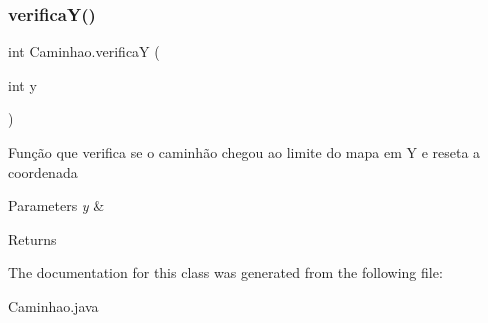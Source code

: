 \subsubsection{\texorpdfstring{verifica\+Y()}{verificaY()}}
{\footnotesize\ttfamily int Caminhao.\+verificaY (\begin{DoxyParamCaption}\item[{int}]{y }\end{DoxyParamCaption})\hspace{0.3cm}{\ttfamily [inline]}}

Função que verifica se o caminhão chegou ao limite do mapa em Y e reseta a coordenada 
\begin{DoxyParams}{Parameters}
{\em y} & \\
\hline
\end{DoxyParams}
\begin{DoxyReturn}{Returns}

\end{DoxyReturn}


The documentation for this class was generated from the following file\+:\begin{DoxyCompactItemize}
\item 
Caminhao.\+java\end{DoxyCompactItemize}
